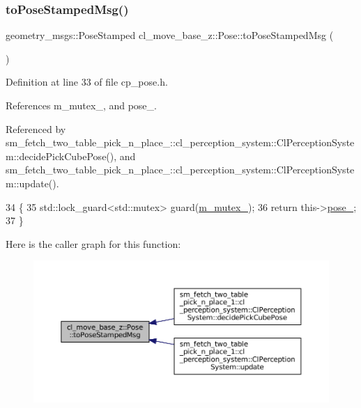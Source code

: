 \subsubsection{\texorpdfstring{to\+Pose\+Stamped\+Msg()}{toPoseStampedMsg()}}
{\footnotesize\ttfamily geometry\+\_\+msgs\+::\+Pose\+Stamped cl\+\_\+move\+\_\+base\+\_\+z\+::\+Pose\+::to\+Pose\+Stamped\+Msg (\begin{DoxyParamCaption}{ }\end{DoxyParamCaption})\hspace{0.3cm}{\ttfamily [inline]}}



Definition at line 33 of file cp\+\_\+pose.\+h.



References m\+\_\+mutex\+\_\+, and pose\+\_\+.



Referenced by sm\+\_\+fetch\+\_\+two\+\_\+table\+\_\+pick\+\_\+n\+\_\+place\+\_\+::cl\+\_\+perception\+\_\+system\+::\+Cl\+Perception\+System\+::decide\+Pick\+Cube\+Pose(), and sm\+\_\+fetch\+\_\+two\+\_\+table\+\_\+pick\+\_\+n\+\_\+place\+\_\+::cl\+\_\+perception\+\_\+system\+::\+Cl\+Perception\+System\+::update().


\begin{DoxyCode}
34     \{
35         std::lock\_guard<std::mutex> guard(\hyperlink{classcl__move__base__z_1_1Pose_a73ed2daba3e473e156cab751fb37b58f}{m\_mutex\_});
36         \textcolor{keywordflow}{return} this->\hyperlink{classcl__move__base__z_1_1Pose_a9da7acf880968a3c220b8436fd0bb6ef}{pose\_};
37     \}
\end{DoxyCode}
Here is the caller graph for this function\+:
\nopagebreak
\begin{figure}[H]
\begin{center}
\leavevmode
\includegraphics[width=350pt]{classcl__move__base__z_1_1Pose_a63887a88c1ac6e9a4a71b8d7d11aed6c_icgraph}
\end{center}
\end{figure}
\mbox{\label{classcl__move__base__z_1_1Pose_abf99d1127cf51a93f97ada2031196114}} 
